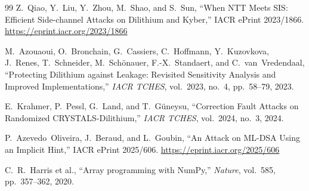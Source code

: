 \documentclass{article}
\begin{document}
\begin{thebibliography}{99}
Z.~Qiao, Y.~Liu, Y.~Zhou, M.~Shao, and S.~Sun,
``When NTT Meets SIS: Efficient Side-channel Attacks on Dilithium and Kyber,''
IACR ePrint 2023/1866.
\url{https://eprint.iacr.org/2023/1866}

M.~Azouaoui, O.~Bronchain, G.~Cassiers, C.~Hoffmann, Y.~Kuzovkova, J.~Renes,
T.~Schneider, M.~Sch\"onauer, F.-X.~Standaert, and C.~van~Vredendaal,
``Protecting Dilithium against Leakage: Revisited Sensitivity Analysis and
Improved Implementations,''
\emph{IACR TCHES}, vol.~2023, no.~4, pp.~58--79, 2023.

E.~Krahmer, P.~Pessl, G.~Land, and T.~G\"{u}neysu,
``Correction Fault Attacks on Randomized CRYSTALS-Dilithium,''
\emph{IACR TCHES}, vol.~2024, no.~3, 2024.

P.~Azevedo~Oliveira, J.~Beraud, and L.~Goubin,
``An Attack on ML-DSA Using an Implicit Hint,''
IACR ePrint 2025/606.
\url{https://eprint.iacr.org/2025/606}

C.~R.~Harris et al.,
``Array programming with NumPy,''
\emph{Nature}, vol.~585, pp.~357--362, 2020.

\end{thebibliography}
\endgroup
\end{document}
